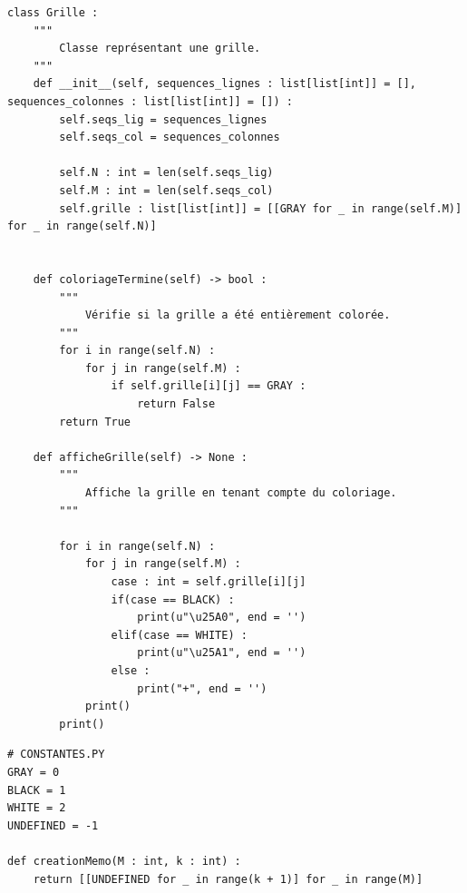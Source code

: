 \documentclass[a4paper,12pt]{article}
\begin{document}
\begin{lstlisting}
class Grille :
    """
        Classe représentant une grille.
    """
    def __init__(self, sequences_lignes : list[list[int]] = [], sequences_colonnes : list[list[int]] = []) :
        self.seqs_lig = sequences_lignes
        self.seqs_col = sequences_colonnes
        
        self.N : int = len(self.seqs_lig)
        self.M : int = len(self.seqs_col)
        self.grille : list[list[int]] = [[GRAY for _ in range(self.M)] for _ in range(self.N)]
        
    
    def coloriageTermine(self) -> bool :
        """
            Vérifie si la grille a été entièrement colorée.
        """
        for i in range(self.N) :
            for j in range(self.M) :
                if self.grille[i][j] == GRAY :
                    return False
        return True
    
    def afficheGrille(self) -> None :
        """
            Affiche la grille en tenant compte du coloriage.
        """

        for i in range(self.N) :
            for j in range(self.M) :
                case : int = self.grille[i][j]
                if(case == BLACK) :
                    print(u"\u25A0", end = '')
                elif(case == WHITE) :
                    print(u"\u25A1", end = '')  
                else :
                    print("+", end = '')
            print()
        print()
\end{lstlisting}

\begin{lstlisting}
# CONSTANTES.PY
GRAY = 0
BLACK = 1
WHITE = 2
UNDEFINED = -1

def creationMemo(M : int, k : int) :
    return [[UNDEFINED for _ in range(k + 1)] for _ in range(M)]
\end{lstlisting}

\newpage
\end{document}
